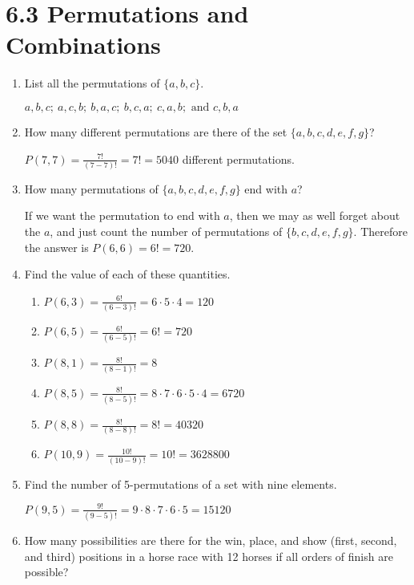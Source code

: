 \documentclass[11pt]{article}
\begin{document}
\section*{\textbf{6.3 Permutations and Combinations}}
\begin{enumerate}[label=\textbf{\arabic*.}]
	\item List all the permutations of $\{ a, b, c\}$.
	
	$a, b, c;\ a, c, b;\ b, a, c;\ b, c, a;\ c, a, b; \text{ and } c, b, a$
	
	\item How many different permutations are there of the set $\{ a, b, c, d, e, f, g \}$?
	
	$P(7, 7) = \frac{7!}{(7 - 7)!} = 7! = 5040$ different permutations.
	
	\item How many permutations of $\{ a, b, c, d, e, f, g \}$ end with $a$?
	
	If we want the permutation to end with $a$, then we may as well forget about the $a$, and just count the number of permutations of $\{ b, c, d, e, f, g \}$. Therefore the answer is $P(6, 6) = 6! = 720$.
	
	\item Find the value of each of these quantities.
	
	\begin{enumerate}[label=\textbf{\alph*)}]
		\item $P(6, 3) = \frac{6!}{(6 - 3)!} = 6 \cdot 5 \cdot 4 = 120$
		\item $P(6, 5) = \frac{6!}{(6 - 5)!} = 6! = 720$
		\item $P(8, 1) = \frac{8!}{(8 - 1)!} = 8$
		\item $P(8, 5) = \frac{8!}{(8 - 5)!} = 8 \cdot 7 \cdot 6 \cdot 5 \cdot 4 = 6720$
		\item $P(8, 8) = \frac{8!}{(8 - 8)!} = 8! = 40320$
		\item $P(10, 9) = \frac{10!}{(10 - 9)!} = 10! = 3628800$
	\end{enumerate}

	\item Find the number of 5-permutations of a set with nine elements.
	
	$P(9, 5) = \frac{9!}{(9 - 5)!} = 9 \cdot 8 \cdot 7 \cdot 6 \cdot 5 = 15120$
	
	\item How many possibilities are there for the win, place, and show (first, second, and third) positions in a horse race with 12 horses if all orders of finish are possible?
	

\end{enumerate}
\end{document}
